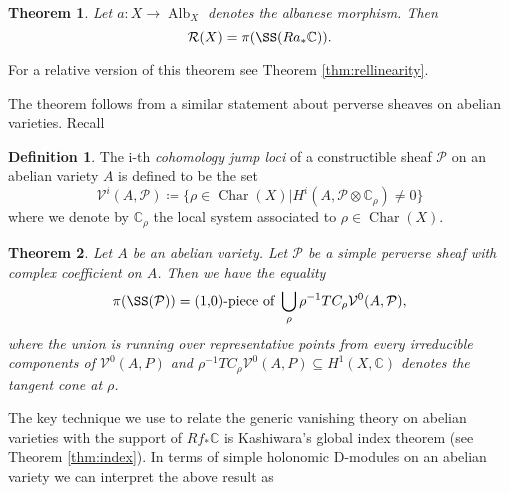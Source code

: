 \documentclass[12pt,reqno]{amsart}
\newtheorem{alphtheorem}{Theorem}
\theoremstyle{question}
\theoremstyle{definition}
\newtheorem{definition}[theorem]{Definition}
\theoremstyle{remark}
\newtheorem{remark}[theorem]{Remark}
\theoremstyle{cited}
\theoremstyle{citeddef}
\DeclareMathOperator{\Alb}{Alb}
\DeclareMathOperator{\Char}{Char}
\newcommand{\sP}{\mathcal{P}}
\newcommand{\sR}{\mathcal{R}}
\newcommand\sV{{\mathcal V}}
\newcommand{\bbC}{\mathbb{C}}
\begin{document}
\begin{alphtheorem}
Let $a\colon X\to \Alb_X$ denotes the albanese morphism. Then
\[\sR(X) =  \pi(\SS(Ra_*\bbC)). \]
\label{thm:linearity}
\end{alphtheorem}
For a relative version of this theorem see Theorem \ref{thm:rellinearity}.

The theorem follows from a similar statement
about perverse sheaves on abelian varieties. Recall
\begin{definition}
The i-th\textsl{ cohomology jump loci} of a constructible sheaf $\sP$ on an abelian variety $A$ is defined to be the set
\[\sV^i(A, \sP) \coloneqq \{\rho\in\Char(X)| H^i(A, \sP\otimes \bbC_{\rho}) \neq 0\}\]
where we denote by $\bbC_{\rho}$ the local system associated to $\rho\in \Char(X)$.
\label{def:cjl}
\end{definition}
\begin{alphtheorem}
Let $A$ be an abelian variety. Let $\sP$ be a simple perverse sheaf with complex coefficient on $A$. 
Then we have the equality
$$\pi(\SS(\sP)) = \text{(1,0)-piece of }\bigcup_{\rho} \rho^{-1} TC_{\rho} \sV^0(A,\sP), $$
where the union is running over representative points from every irreducible components of $\sV^0(A,P)$ and
$\rho^{-1}TC_{\rho} \sV^0(A,P) \subseteq H^1(X, \bbC)$ denotes the tangent cone at $\rho$. 
\label{thm:perverse}
\end{alphtheorem}

The key technique we
use to relate the generic vanishing theory on abelian varieties with the support of $Rf_*\bbC$ is Kashiwara's
global index theorem (see Theorem \ref{thm:index}). In terms of simple holonomic D-modules
on an abelian variety we can interpret the above result as
\end{document}
